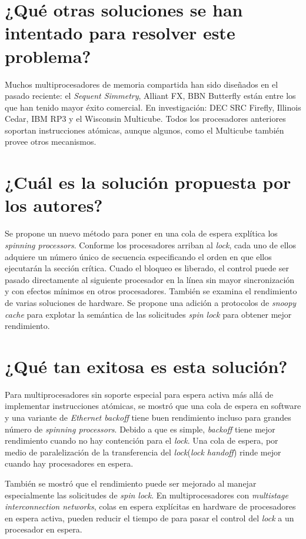 \section{¿Qué otras soluciones se han intentado para resolver este problema?}
Muchos multiprocesadores de memoria compartida han sido diseñados en el pasado reciente: el \textit{Sequent Simmetry}, Alliant FX, BBN Butterfly están entre los que han tenido mayor éxito comercial. En investigación: DEC SRC Firefly, Illinois Cedar, IBM RP3 y el Wisconsin Multicube. Todos los procesadores anteriores soportan instrucciones atómicas, aunque algunos, como el Multicube también provee otros mecanismos.

     
\section{¿Cuál es la solución propuesta por los autores?}
Se propone un nuevo método para poner en una cola de espera explítica los \textit{spinning processors}. Conforme los procesadores arriban al \textit{lock}, cada uno de ellos adquiere un número único de secuencia especificando el orden en que ellos ejecutarán la sección crítica. Cuado el bloqueo es liberado, el control puede ser pasado directamente al siguiente procesador en la línea sin mayor sincronización y con efectos mínimos en otros procesadores. También se examina el rendimiento de varias soluciones de hardware. Se propone una adición a protocolos de \textit{snoopy cache} para explotar la semántica de las solicitudes \textit{spin lock} para obtener mejor rendimiento. 

\section{¿Qué tan exitosa es esta solución?} 
Para multiprocesadores sin soporte especial para espera activa más allá de implementar instrucciones atómicas, se mostró que una cola de espera en software y una variante de \textit{Ethernet backoff} tiene buen rendimiento incluso para grandes número de \textit{spinning processors}. Debido a que es simple, \textit{backoff} tiene mejor rendimiento cuando no hay contención para el \textit{lock}. Una cola de espera, por medio de paralelización de la transferencia del \textit{lock}(\textit{lock handoff}) rinde mejor cuando hay procesadores en espera.

También se mostró que el rendimiento puede ser mejorado al manejar especialmente las solicitudes de \textit{spin lock}. En multiprocesadores con \textit{multistage interconnection networks}, colas en espera explícitas en hardware de procesadores en espera activa, pueden reducir el tiempo de para pasar el control del \textit{lock} a un procesador en espera.


